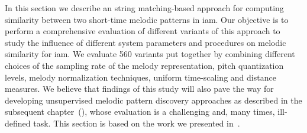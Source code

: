 



In this section we describe an string matching-based approach for computing similarity between two short-time melodic patterns in \gls{iam}. Our objective is to perform a comprehensive evaluation of different variants of this approach to study the influence of different system parameters and procedures on melodic similarity for \gls{iam}. We evaluate 560 variants put together by combining different choices of the sampling rate of the melody representation, pitch quantization levels, melody normalization techniques, uniform time-scaling and distance measures. We believe that findings of this study will also pave the way for developing unsupervised melodic pattern discovery approaches as described in the subsequent chapter~(), whose evaluation is a challenging and, many times, ill-defined task. This section is based on the work we presented in~\cite{gulati_ICASSP2015}.

